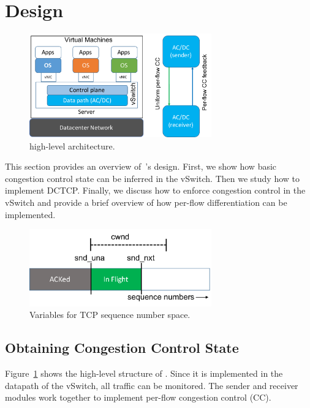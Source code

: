 \section{Design}
\label{design}
\begin{figure}[!t]
        \centering
  \includegraphics[width=0.7\textwidth]{acdctcp/figures/acdc_highlevel.pdf}
        \caption{\acdc{} high-level architecture.}
        \label{acdc_highlevel}
\end{figure}

This section provides an overview of~\acdc{}'s design. First, we show how basic
congestion control state can be inferred in the vSwitch. Then we study
how to implement DCTCP. Finally, we discuss how to enforce congestion
control in the vSwitch and provide a brief overview of how per-flow differentiation
can be implemented.


\begin{figure}[th]
        \centering
  \includegraphics[width=0.7\textwidth]{acdctcp/figures/tcp-state-new.pdf}
        \caption{Variables for TCP sequence number space.}
        \label{tcpstate}
\end{figure}
\subsection{Obtaining Congestion Control State}
\label{ss:tcpstate}
Figure~\ref{acdc_highlevel} shows the high-level structure of \acdc{}. Since it is
implemented in the datapath of the vSwitch, all traffic can be monitored. The sender
and receiver modules work together to implement per-flow congestion control (CC).

